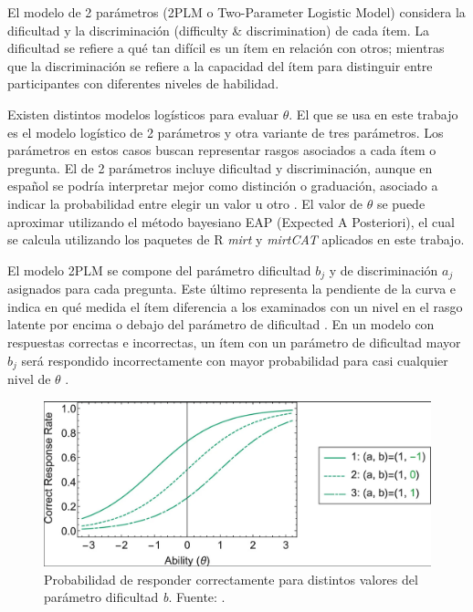 El modelo de 2 parámetros (2PLM o Two-Parameter Logistic Model) considera la dificultad y la discriminación (difficulty \& discrimination) de cada ítem. La dificultad se refiere a qué tan difícil es un ítem en relación con otros; mientras que la discriminación se refiere a la capacidad del ítem para distinguir entre participantes con diferentes niveles de habilidad. 

Existen distintos modelos logísticos para evaluar $\theta$. El que se usa en este trabajo es el modelo logístico de 2 parámetros y otra variante de tres parámetros. Los parámetros en estos casos buscan representar rasgos asociados a cada ítem o pregunta. El de 2 parámetros incluye dificultad y discriminación, aunque en español se podría interpretar mejor como distinción o graduación, asociado a indicar la probabilidad entre elegir un valor u otro \cite{CalderonStatisticalIRT}.  El valor de $\theta$ se puede aproximar utilizando el método bayesiano EAP (Expected A Posteriori), el cual se calcula utilizando los paquetes de R \textit{mirt} \cite{RMIRT} y \textit{mirtCAT} \cite{RPackageMIRTCAT} aplicados en este trabajo. 

El modelo 2PLM se compone del parámetro dificultad $b_j$ y de discriminación $a_j$ asignados para cada pregunta. Este último representa la pendiente de la curva e indica en qué medida el ítem diferencia a los examinados con un nivel en el rasgo latente por encima o debajo del parámetro de dificultad \cite{TeoriaRespuestaAlItemPsicologia}. En un modelo con respuestas correctas e incorrectas, un ítem con un parámetro de dificultad mayor $b_j$ será respondido incorrectamente con mayor probabilidad para casi cualquier nivel de $\theta$ \cite{IRTShojima2022}.


\begin{figure}[h]
	\centering
	\includegraphics[scale=.5]{imagenes/IRTparambdifficulty.png}
	\caption{Probabilidad de responder correctamente para distintos valores del parámetro dificultad \textit{b}. Fuente: \cite{IRTShojima2022}.}
	\label{ParamDifficulty}
\end{figure}


